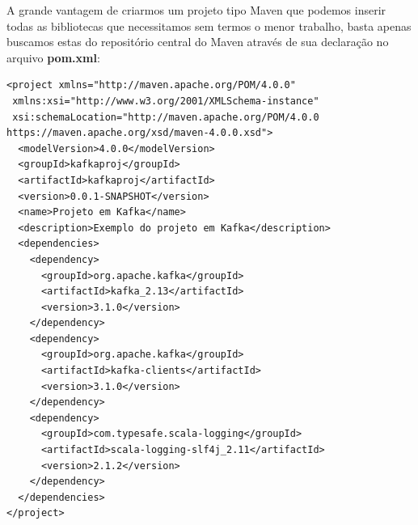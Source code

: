 \documentclass[a4paper,11pt]{article}
\begin{document}
A grande vantagem de criarmos um projeto tipo Maven que podemos inserir todas as bibliotecas que necessitamos sem termos o menor trabalho, basta apenas buscamos estas do repositório central do Maven através de sua declaração no arquivo \textbf{pom.xml}:
\begin{lstlisting}[]
<project xmlns="http://maven.apache.org/POM/4.0.0"
 xmlns:xsi="http://www.w3.org/2001/XMLSchema-instance"
 xsi:schemaLocation="http://maven.apache.org/POM/4.0.0 https://maven.apache.org/xsd/maven-4.0.0.xsd">
  <modelVersion>4.0.0</modelVersion>
  <groupId>kafkaproj</groupId>
  <artifactId>kafkaproj</artifactId>
  <version>0.0.1-SNAPSHOT</version>
  <name>Projeto em Kafka</name>
  <description>Exemplo do projeto em Kafka</description>
  <dependencies>
    <dependency>
      <groupId>org.apache.kafka</groupId>
      <artifactId>kafka_2.13</artifactId>
      <version>3.1.0</version>
    </dependency>
    <dependency>
      <groupId>org.apache.kafka</groupId>
      <artifactId>kafka-clients</artifactId>
      <version>3.1.0</version>
    </dependency>
    <dependency>
      <groupId>com.typesafe.scala-logging</groupId>
      <artifactId>scala-logging-slf4j_2.11</artifactId>
      <version>2.1.2</version>
    </dependency>
  </dependencies>
</project>
\end{lstlisting}
\end{document}
